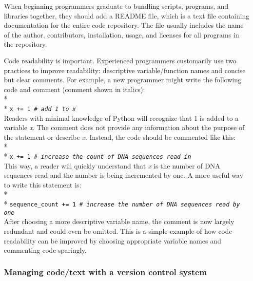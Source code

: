 \documentclass[ChapterTOCs,krantz2]{krantz} %
\begin{document}
When beginning programmers graduate to bundling scripts, programs, and libraries together,
they should add a README file, which is a text file containing
documentation for the entire code repository. The file usually includes
the name of the author, contributors,
installation, usage, and licenses for all programs in the repository.

Code readability is important.  
Experienced programmers customarily use two practices to improve readability:
descriptive variable/function names and concise but clear comments.  
For example, a new programmer might write the following code and comment 
(comment shown in italics):\\* \\*
\texttt{x += 1  \emph{\# add 1 to x}}\\

\noindent
Readers with minimal knowledge of Python will recognize that 1 is added
to a variable \emph{x}. The comment does not provide any information about the purpose
of the statement or describe \emph{x}. Instead, the code should be commented like this:\\* \\*
\texttt{x += 1  \emph{\# increase the count of DNA sequences read in}}\\

This way, a reader will quickly understand that \emph{x} is the number of DNA
sequences read and the number is being incremented by one.  A more useful way
to write this statement is:\\* \\*
\texttt{sequence\_count += 1 \emph{\# increase the number of DNA sequences read by one}}\\

\noindent
After choosing a more descriptive variable name, the comment is now largely
redundant and could even be omitted. 
This is a simple example of how code readability can be improved 
by choosing appropriate variable names and commenting code sparingly.

\subsubsection{Managing code/text with a version control system}
\end{document}
